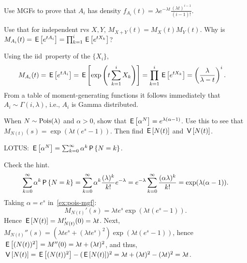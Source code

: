 \documentclass[stochastic-or.tex]{subfiles}
\begin{document}
\begin{exercise}\label{ex:54}
Use MGFs to  prove that $A_i$ has density
$f_{A_i}(t) = \lambda e^{-\lambda t} \frac{(\lambda t)^{i-1}}{(i-1)!}$.
\begin{hint}
Use that for independent rvs $X, Y$, $M_{X+Y}(t)=M_{X}(t) M_{Y}(t)$.
Why is $M_{A_i}(t) = \E{e^{t A_i}} = \prod_{k=1}^{i} \E{e^{tX_k}}$?
\end{hint}
\begin{solution}
 Using the iid\ property of the $\{X_i\}$,
\begin{align*}
 M_{A_i}(t) &= \E{e^{t A_i}} = \E{\exp\left(t\sum_{k=1}^{i} X_k\right)}  = \prod_{k=1}^{i} \E{e^{tX_k}} =
  \left(\frac{\lambda}{\lambda -t }\right)^i.
\end{align*}
From a table of moment-generating functions it follows immediately that
$A_i \sim \Gamma(i,\lambda)$, i.e., $A_i$ is Gamma distributed.
\end{solution}
\end{exercise}

\begin{exercise}\label{ex:pois-mgf}
When $N \sim \Pois{\lambda}$ and $\alpha > 0$, show that $\E{\alpha^{N}} = e^{\lambda(\alpha-1)}$.
Use this to see that $M_{N(t)}(s) = \exp{(\lambda t(e^s-1))}$. Then  find $\E{N(t)}$ and $\V{N(t)}$.
\begin{hint}
LOTUS: $\E{\alpha^{N}} = \sum_{k=0}^\infty \alpha^{k} \P{N=k}$.
\end{hint}
\begin{solution}
Check the hint.
\begin{align*}
\sum_{k=0}^\infty \alpha^{k} \P{N=k} = \sum_{k=0}^\infty \alpha^{k} \frac{(\lambda)^k}{k!} e^{-\lambda}
= e^{-\lambda} \sum_{k=0}^\infty \frac{(\alpha \lambda)^k}{k!} =\exp(\lambda (\alpha - 1)).
\end{align*}
Taking $\alpha=e^{s}$ in~\cref{ex:pois-mgf}:
 \begin{equation*}
 M_{N(t)}'(s) = \lambda t e^s \exp(\lambda t(e^s - 1)).
 \end{equation*}
 Hence $\E{N(t)} = M_{N(t)}'(0) = \lambda t $.
Next, $M_{N(t)}''(s) = (\lambda t e^s + (\lambda t e^s)^2) \exp(\lambda t(e^s - 1))$, hence $\E{(N(t))^2} = M''(0) = \lambda t + (\lambda t)^2$, and thus, $\V{N(t)} =\E{(N(t))^2}-(\E{N(t)})^2 = \lambda t + (\lambda t)^2 - (\lambda t)^2 = \lambda t$.

\end{solution}
\end{exercise}
\end{document}
